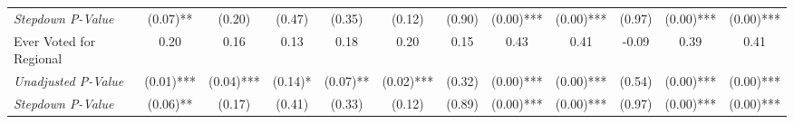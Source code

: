 \begin{tabular}{l c c c c c c c c c c c}
\quad \textit{Stepdown P-Value} & (0.07)** & (0.20) & (0.47) & (0.35) & (0.12) & (0.90) & (0.00)*** & (0.00)*** & (0.97) & (0.00)*** & (0.00)*** \\
Ever Voted for Regional & 0.20 & 0.16 & 0.13 & 0.18 & 0.20 & 0.15 & 0.43 & 0.41 & -0.09 & 0.39 & 0.41 \\
\quad \textit{Unadjusted P-Value} & (0.01)*** & (0.04)*** & (0.14)* & (0.07)** & (0.02)*** & (0.32) & (0.00)*** & (0.00)*** & (0.54) & (0.00)*** & (0.00)*** \\
\quad \textit{Stepdown P-Value} & (0.06)** & (0.17) & (0.41) & (0.33) & (0.12) & (0.89) & (0.00)*** & (0.00)*** & (0.97) & (0.00)*** & (0.00)*** \\
\bottomrule
\end{tabular}
